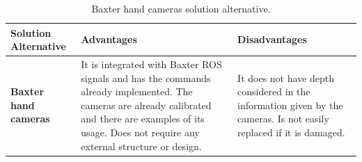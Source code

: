 \documentclass[11pt]{report} %
\begin{document}
\begin{table}[H]
\begin{center}
    \begin{tabular}{M{6.6cm}M{3.3cm}M{3.3cm}}
    \hline
    \textbf{Solution Alternative} & \textbf{Advantages} & \textbf{Disadvantages} \\ 
    \hline
    
    \textbf{Baxter hand cameras}

    
    \citep{cite_baxter_hand_camera}

    &

    It is integrated with Baxter ROS signals and has the commands already implemented. The cameras are already calibrated and there are examples of its usage. Does not require any external structure or design.

    &

    It does not have depth considered in the information given by the cameras. Is not easily replaced if it is damaged.

    \\ \hline
    \end{tabular}
\caption{\label{tab:baxter_hand_camera} Baxter hand cameras solution alternative.}
\end{center}
\end{table}
\end{document}
